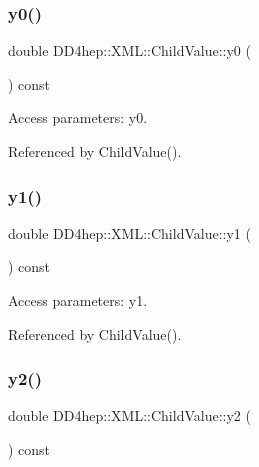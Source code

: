 \subsubsection{\texorpdfstring{y0()}{y0()}}
{\footnotesize\ttfamily double D\+D4hep\+::\+X\+M\+L\+::\+Child\+Value\+::y0 (\begin{DoxyParamCaption}{ }\end{DoxyParamCaption}) const}



Access parameters\+: y0. 



Referenced by Child\+Value().

\hypertarget{struct_d_d4hep_1_1_x_m_l_1_1_child_value_a1ad5890374ce575719bb7571f41d1b7e}{}\label{struct_d_d4hep_1_1_x_m_l_1_1_child_value_a1ad5890374ce575719bb7571f41d1b7e} 
\subsubsection{\texorpdfstring{y1()}{y1()}}
{\footnotesize\ttfamily double D\+D4hep\+::\+X\+M\+L\+::\+Child\+Value\+::y1 (\begin{DoxyParamCaption}{ }\end{DoxyParamCaption}) const}



Access parameters\+: y1. 



Referenced by Child\+Value().

\hypertarget{struct_d_d4hep_1_1_x_m_l_1_1_child_value_a0418217990ece3a5ed4a67f302faff73}{}\label{struct_d_d4hep_1_1_x_m_l_1_1_child_value_a0418217990ece3a5ed4a67f302faff73} 
\subsubsection{\texorpdfstring{y2()}{y2()}}
{\footnotesize\ttfamily double D\+D4hep\+::\+X\+M\+L\+::\+Child\+Value\+::y2 (\begin{DoxyParamCaption}{ }\end{DoxyParamCaption}) const}



